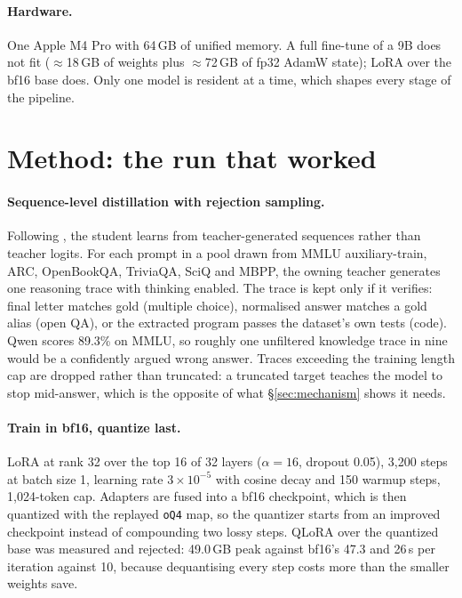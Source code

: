 \documentclass[11pt]{article}
\newcommand{\oQ}{\texttt{oQ4}}
\begin{document}
\paragraph{Hardware.}
One Apple M4 Pro with 64\,GB of unified memory.  A full fine-tune of a 9B does
not fit ($\approx$18\,GB of weights plus $\approx$72\,GB of fp32 AdamW state);
LoRA \citep{hu2022lora} over the bf16 base does.  Only one model is resident at
a time, which shapes every stage of the pipeline.

\section{Method: the run that worked}
\label{sec:method}

\paragraph{Sequence-level distillation with rejection sampling.}
Following \citet{kim2016sequence}, the student learns from teacher-generated
sequences rather than teacher logits.  For each prompt in a pool drawn from
MMLU auxiliary-train, ARC, OpenBookQA, TriviaQA, SciQ and MBPP, the owning
teacher generates one reasoning trace with thinking enabled.  The trace is
kept only if it verifies: final letter matches gold (multiple choice),
normalised answer matches a gold alias (open QA), or the extracted program
passes the dataset's own tests (code).  Qwen scores 89.3\% on MMLU, so roughly
one unfiltered knowledge trace in nine would be a confidently argued wrong
answer.  Traces exceeding the training length cap are dropped rather than
truncated: a truncated target teaches the model to stop mid-answer, which is
the opposite of what \S\ref{sec:mechanism} shows it needs.

\paragraph{Train in bf16, quantize last.}
LoRA at rank 32 over the top 16 of 32 layers ($\alpha=16$, dropout 0.05),
3{,}200 steps at batch size 1, learning rate $3\times10^{-5}$ with cosine decay
and 150 warmup steps, 1{,}024-token cap.  Adapters are fused into a bf16
checkpoint, which is then quantized with the replayed \oQ{} map, so the
quantizer starts from an improved checkpoint instead of compounding two lossy
steps.  QLoRA \citep{dettmers2023qlora} over the quantized base was measured and
rejected: 49.0\,GB peak against bf16's 47.3 and 26\,s per iteration against 10,
because dequantising every step costs more than the smaller weights save.
\end{document}
